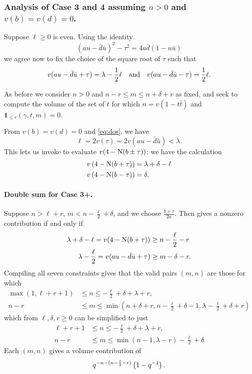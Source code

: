 \subsubsection{Analysis of Case 3 and 4 assuming $n > 0$ and $v(b) = v(d) = 0$.}
Suppose $\ell \geq 0$ is even.
Using the identity
\[ (au-\bar d \bar u)^2 - \tau^2 = 4a\bar d(1- u\bar u) \]
we agree now to fix the choice of the square root of $\tau$ such that
\begin{equation}
  v(au-\bar d \bar u + \tau) = \lambda - \frac{1}{2} \ell \quad\text{and}\quad
  v(au-\bar d \bar u - \tau) = \frac{1}{2} \ell.
  \label{eq:tau_choice}
\end{equation}

As before we consider $n > 0$ and $n-r \le m \le n+\delta+r$ as fixed,
and seek to compute the volume of the set of $t$
for which $n = v(1-t\bar t)$ and $\mathbf{1}_{\le r}(\gamma,t,m) = 0$.

From $v(b) = v(d) = 0$ and \eqref{eq:dos}, we have
\[ \ell = 2v(\tau) = 2v(au - \bar d \bar u) < \lambda. \]
This lets us invoke \cite[Lemma 4.7]{ref:AFL} to evaluate $v(4-\operatorname{N}(b \pm \tau))$:
we have the calculation
\begin{align*}
  v\left( 4 - \operatorname{N}(b+\tau) \right) &= \lambda + \delta - \ell \\
  v\left( 4 - \operatorname{N}(b-\tau) \right) &= \delta.
\end{align*}

\paragraph{Double sum for Case 3\ts+.}
Suppose $n > \ell + r$,
$m < n - \frac{\ell}{2} + \delta$, and we choose $\frac{b+\tau}{2a}$.
Then  gives a nonzero contribution if and only if
\begin{align*}
  \lambda + \delta - \ell = v(4-\operatorname{N}(b+\tau)) &\geq n - \frac{\ell}{2} - r \\
  \lambda - \frac{\ell}{2} = v(au-\bar d \bar u + \tau) & \geq m - \delta - r.
\end{align*}
Compiling all seven constraints gives that the valid pairs $(m,n)$ are those for which
\begin{align*}
  \max(1, \ell+r+1) &\leq n \leq -\frac{\ell}{2} + \delta + \lambda + r, \\
  n-r &\leq m \leq \min\left( n+\delta+r, n - \frac{\ell}{2}+\delta - 1,
    \lambda-\frac{\ell}{2}+\delta+r \right)
\end{align*}
which from $\ell, \delta, r \ge 0$ can be simplified to just
\begin{equation}
  \begin{aligned}
    \ell+r+1 &\leq n \leq  -\frac{\ell}{2} + \delta + \lambda + r, \\
    n-r &\leq m \leq \min(n-1, \lambda-r) - \frac{\ell}{2} + \delta
  \end{aligned}
  \label{eq:even_case3_plus}
\end{equation}
Each $(m,n)$ gives a volume contribution of
\[ q^{-n - (n - \frac{\ell}{2} - r)} \left( 1 - q^{-1} \right). \]

